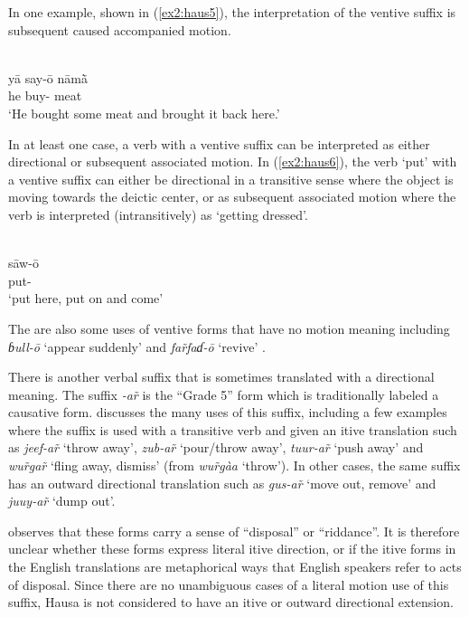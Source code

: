 In one example, shown in (\ref{ex2:haus5}), the interpretation of the ventive suffix is subsequent caused accompanied motion.

\ea\label{ex2:haus5}
 \\
\gll yā	say-ō	nāmā̀ \\
he	buy-	meat \\
\glt `He bought some meat and brought it back here.'
\z 

In at least one case, a verb with a ventive suffix can be interpreted as either directional or subsequent associated motion. In (\ref{ex2:haus6}), the verb `put' with a ventive suffix can either be directional in a transitive sense where the object is moving towards the deictic center, or as subsequent associated motion where the verb is interpreted (intransitively) as `getting dressed'. 

\ea\label{ex2:haus6}
 \\
\gll sāw-ō \\
put- \\
\glt `put here, put on and come'
\z 

The are also some uses of ventive forms that have no motion meaning including \textit{ɓull-ō} `appear suddenly' and \textit{far̃faɗ-ō} `revive' \citep[663]{newmanHausaLanguageEncyclopedic2000}.

There is another verbal suffix that is sometimes translated with a directional meaning. The suffix \textit{-ar̃} is the ``Grade 5'' form which is traditionally labeled a causative form. \citet{jaggarHausaGrade52014} discusses the many uses of this suffix, including a few examples where the suffix is used with a transitive verb and given an itive translation such as \textit{jeef-ar̃} `throw away', \textit{zub-ar̃} `pour/throw away', \textit{tuur-ar̃} `push away' and \textit{wur̃gar̃} `fling away, dismiss' (from \textit{wur̃gàa} `throw'). In other cases, the same suffix has an outward directional translation such as \textit{gus-ar̃} `move out, remove' and \textit{juuy-ar̃} `dump out'.

\citet{parsonsFurtherObservationsCausative1962} observes that these forms carry a sense of ``disposal'' or ``riddance''. It is therefore unclear whether these forms express literal itive direction, or if the itive forms in the English translations are metaphorical ways that English speakers refer to acts of disposal. Since there are no unambiguous cases of a literal motion use of this suffix, Hausa is not considered to have an itive or outward directional extension.

